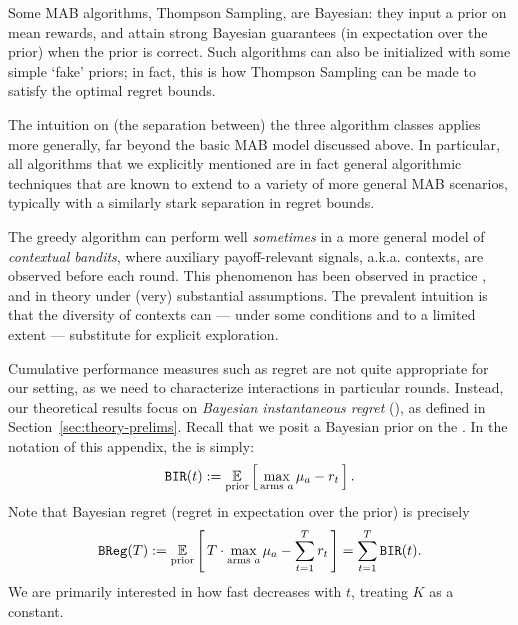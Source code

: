 Some MAB algorithms, \eg Thompson Sampling, are Bayesian: they input a prior on mean rewards, and attain strong Bayesian guarantees (in expectation over the prior) when the prior is correct. Such algorithms can also be initialized with some simple `fake' priors; in fact, this is how Thompson Sampling can be made to satisfy the optimal regret bounds.

The intuition on (the separation between) the three algorithm classes applies more generally, far beyond the basic MAB model discussed above. In particular, all algorithms that we explicitly mentioned are in fact general algorithmic techniques that are known to extend to a variety of more general MAB scenarios, typically with a similarly stark separation in regret bounds.


The greedy algorithm can perform well \emph{sometimes} in a more general model of \emph{contextual bandits}, where auxiliary payoff-relevant signals, a.k.a. contexts, are observed before each round. This phenomenon has been observed in practice
\citep{practicalCB-arxiv18}, and in theory \citep{kannan2018smoothed,bastani2017exploiting,externalities-colt18} under (very) substantial assumptions. The prevalent intuition is that the diversity of contexts can --- under some conditions and to a limited extent --- substitute for explicit exploration.

Cumulative performance measures such as regret are not quite appropriate for our setting, as we need to characterize interactions in particular rounds. Instead, our theoretical results focus on \emph{Bayesian instantaneous regret} (\BIR), as defined in Section~\ref{sec:theory-prelims}. Recall that we posit a Bayesian prior on the \MRVs. In the notation of this appendix, the \BIR is simply:
\begin{align*}%
\BIR(t) := \E_{\text{prior}}\sbr{ \max_{\text{arms $a$}} \mu_a - r_t}.
\end{align*}
\noindent Note that Bayesian regret (\ie regret in expectation over the prior) is precisely
\begin{align}\label{eq:bg-BReg}
  \BReg(T):=
    \E_{\text{prior}}\sbr{ T\cdot \max_{\text{arms $a$}}\mu_a - \sum_{t=1}^T r_t }
    = \sum_{t=1}^T \BIR(t).
\end{align}
We are primarily interested in how fast \BIR decreases with $t$, treating $K$ as a constant.


